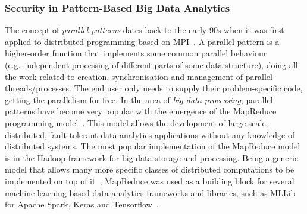 \documentclass[a4paper,11pt]{article}
\begin{document}
\pagebreak

\subsubsection{Security in Pattern-Based Big Data Analytics}
\label{sect:patterns}

The concept of \emph{parallel patterns} dates back to the early 90s when it was first applied to distributed programming based on MPI~\cite{cole89skeletons}. A parallel pattern is a higher-order function that implements some common parallel behaviour (e.g.~independent processing of different parts of some data structure), doing all the work related to creation, synchronisation and management of parallel threads/processes. The end user only needs to supply their problem-specific code, getting the parallelism for free. 
In the area of \emph{big data processing}, parallel patterns have become very popular with the emergence of the MapReduce programming model~\cite{mapreduce}. This model allows the development of large-scale, distributed, fault-tolerant data analytics applications without any knowledge of distributed systems. The most popular implementation of the MapReduce model is in the Hadoop framework for big data storage and processing. Being a generic model that allows many more specific classes of distributed computations to be implemented on top of it~\cite{bigdatabook}, MapReduce was used as a building block for several machine-learning based data analytics frameworks and libraries, such as MLLib~\cite{mllib} for Apache Spark, Keras and Tensorflow~\cite{tensorflow}.
%
\end{document}
